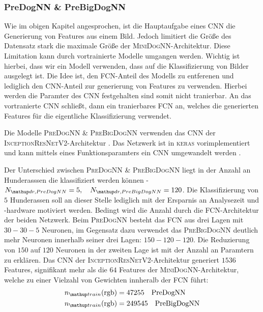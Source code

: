 \subsubsection{PreDogNN \& PreBigDogNN}
Wie im obigen Kapitel angesprochen, ist die Hauptaufgabe eines CNN die Generierung
von Features aus einem Bild. Jedoch limitiert die Größe des Datensatz stark
die maximale Größe der \textsc{MiniDogNN}-Architektur. Diese Limitation
kann durch vortrainierte Modelle umgangen werden. Wichtig ist hierbei, dass wir
ein Modell verwenden, dass auf die Klassifizierung von Bilder ausgelegt ist.
Die Idee ist, den FCN-Anteil des Modells zu entferenen und lediglich den CNN-Anteil
zur generierung von Features zu verwenden. Hierbei werden die Paramter des CNN
festgehalten sind somit nicht tranierbar. An das vortranierte CNN schließt, dann
ein tranierbares FCN an, welches die generierten Features für die eigentliche
Klassifizierung verwendet.

Die Modelle \textsc{PreDogNN \& PreBigDogNN} verwenden das CNN der
\textsc{InceptionResNetV2}-Architektur \cite{InceptionResNetV2}. Das Netzwerk
ist in \textsc{keras} vorimplementiert und kann mittels eines Funktionsparamters
ein CNN umgewandelt werden \cite{keras_InceptionResNetV2}.

Der Unterschied zwischen \textsc{PreDogNN \& PreBigDogNN} liegt in der Anzahl
an Hunderasssen die klassifiziert werden können - $N\ua{dr, PreDogNN}=5, \quad N\ua{dr, PreBigDogNN}=120$. Die Klassifizierung von $5$ Hunderassen
soll an dieser Stelle lediglich mit der Ersparnis an Analysezeit und -hardware
motiviert werden. Bedingt wird die Anzahl durch die FCN-Architektur der beiden
Netzwerk. Beim \textsc{PreDogNN} besteht das FCN aus drei Lagen mit $30-30-5$
Neuronen, im Gegensatz dazu verwendet das \textsc{PreBigDogNN} deutlich
mehr Neuronen innerhalb seiner drei Lagen: $150-120-120$. Die Reduzierung von
$150$ auf $120$ Neuronen in der zweiten Lage ist mit der Anzahl an Paramtern
zu erklären. Das CNN der \textsc{InceptionResNetV2}-Architektur generiert
$1536$ Features, signifikant mehr als die $64$ Features der \textsc{MiniDogNN}-Architektur,
welche zu einer Vielzahl von Gewichten innheralb der FCN führt:
\begin{align}
  \begin{aligned}
  \label{eq:ntrain_PreDogNN_PreBigDogNN}
  n\ua{train}(\mathrm{rgb}) &= 47255 \quad \mathrm{PreDogNN} \\
  n\ua{train}(\mathrm{rgb}) &= 249545 \quad \mathrm{PreBigDogNN}
\end{aligned}
\end{align}
